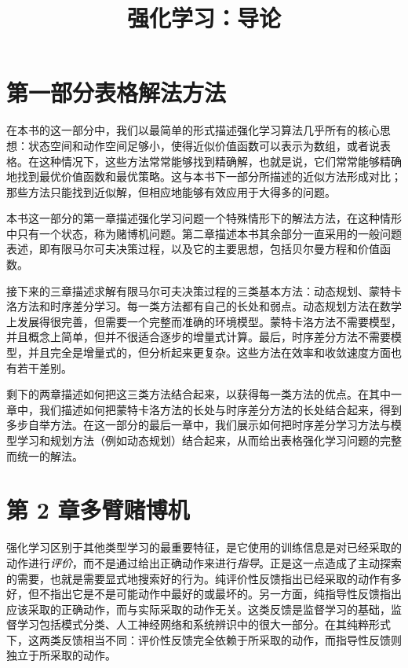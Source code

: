 \documentclass[UTF8,12pt,a4paper,fontset=fandol]{ctexart}
\title{强化学习：导论}
\author{}
\date{}
\begin{document}
\maketitle

\section*{第一部分\quad 表格解法方法}

在本书的这一部分中，我们以最简单的形式描述强化学习算法几乎所有的核心思想：状态空间和动作空间足够小，使得近似价值函数可以表示为数组，或者说表格。在这种情况下，这些方法常常能够找到精确解，也就是说，它们常常能够精确地找到最优价值函数和最优策略。这与本书下一部分所描述的近似方法形成对比；那些方法只能找到近似解，但相应地能够有效应用于大得多的问题。

本书这一部分的第一章描述强化学习问题一个特殊情形下的解法方法，在这种情形中只有一个状态，称为赌博机问题。第二章描述本书其余部分一直采用的一般问题表述，即有限马尔可夫决策过程，以及它的主要思想，包括贝尔曼方程和价值函数。

接下来的三章描述求解有限马尔可夫决策过程的三类基本方法：动态规划、蒙特卡洛方法和时序差分学习。每一类方法都有自己的长处和弱点。动态规划方法在数学上发展得很完善，但需要一个完整而准确的环境模型。蒙特卡洛方法不需要模型，并且概念上简单，但并不很适合逐步的增量式计算。最后，时序差分方法不需要模型，并且完全是增量式的，但分析起来更复杂。这些方法在效率和收敛速度方面也有若干差别。

剩下的两章描述如何把这三类方法结合起来，以获得每一类方法的优点。在其中一章中，我们描述如何把蒙特卡洛方法的长处与时序差分方法的长处结合起来，得到多步自举方法。在这一部分的最后一章中，我们展示如何把时序差分学习方法与模型学习和规划方法（例如动态规划）结合起来，从而给出表格强化学习问题的完整而统一的解法。

\section*{第 2 章\quad 多臂赌博机}

强化学习区别于其他类型学习的最重要特征，是它使用的训练信息是对已经采取的动作进行\textit{评价}，而不是通过给出正确动作来进行\textit{指导}。正是这一点造成了主动探索的需要，也就是需要显式地搜索好的行为。纯评价性反馈指出已经采取的动作有多好，但不指出它是不是可能动作中最好的或最坏的。另一方面，纯指导性反馈指出应该采取的正确动作，而与实际采取的动作无关。这类反馈是监督学习的基础，监督学习包括模式分类、人工神经网络和系统辨识中的很大一部分。在其纯粹形式下，这两类反馈相当不同：评价性反馈完全依赖于所采取的动作，而指导性反馈则独立于所采取的动作。
\end{document}
